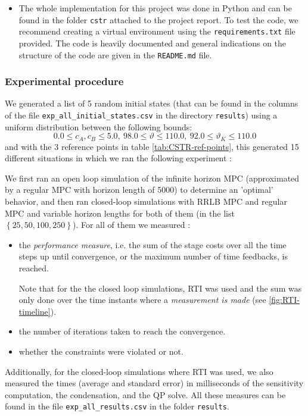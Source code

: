 \documentclass[12pt]{article}
\begin{document}
\begin{itemize}[label=\textbullet]
	\item The whole implementation for this project was done in Python and can be found in the folder \verb|cstr| attached to the project report.
	To test the code, we recommend creating a virtual environment using the \verb|requirements.txt| file provided.
	The code is heavily documented and general indications on the structure of the code are given in the \verb|README.md| file.
\end{itemize}

\subsubsection{Experimental procedure}

We generated a list of 5 random initial states (that can be found in the columns of the file \verb|exp_all_initial_states.csv| in the directory \verb|results|) using a uniform distribution between the following bounds:
$$0.0\leq c_A,c_B\leq 5.0,~98.0\leq\vartheta\leq 110.0,~92.0\leq \vartheta_K\leq 110.0$$
and with the 3 reference points in table \ref{tab:CSTR-ref-points}, this generated 15 different situations in which we ran the following experiment :

We first ran an open loop simulation of the infinite horizon MPC (approximated by a regular MPC with horizon length of 5000) to determine an 'optimal' behavior, and then ran closed-loop simulations with RRLB MPC and regular MPC and variable horizon lengths for both of them (in the list $\left\{ 25, 50, 100, 250 \right\}$).
For all of them we measured :
\begin{itemize}[label=\textbullet]
	\item the \textit{performance measure}, i.e. the sum of the stage costs over all the time steps up until convergence, or the maximum number of time feedbacks, is reached.

	Note that for the the closed loop simulations, RTI was used and the sum was only done over the time instants where a \textit{measurement is made} (see \ref{fig:RTI-timeline}).

	\item the number of iterations taken to reach the convergence.

	\item whether the constraints were violated or not.
\end{itemize}

\noindent Additionally, for the closed-loop simulations where RTI was used, we also measured the times (average and standard error) in milliseconds of the sensitivity computation, the condensation, and the QP solve.
All these measures can be found in the file \verb|exp_all_results.csv| in the folder \verb|results|.
\end{document}
